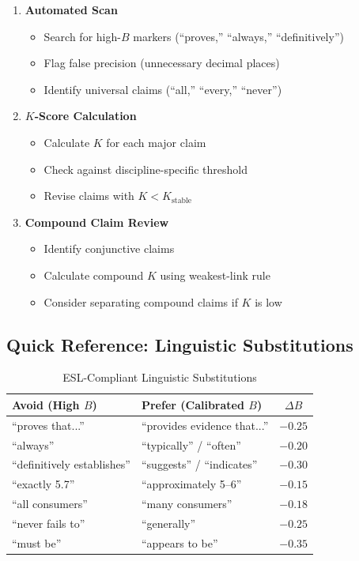 \documentclass[11pt,a4paper]{article}
\begin{document}
\begin{enumerate}
    \item \textbf{Automated Scan}
    \begin{itemize}
        \item[$\square$] Search for high-$B$ markers (``proves,'' ``always,'' ``definitively'')
        \item[$\square$] Flag false precision (unnecessary decimal places)
        \item[$\square$] Identify universal claims (``all,'' ``every,'' ``never'')
    \end{itemize}

    \item \textbf{$K$-Score Calculation}
    \begin{itemize}
        \item[$\square$] Calculate $K$ for each major claim
        \item[$\square$] Check against discipline-specific threshold
        \item[$\square$] Revise claims with $K < K_{\text{stable}}$
    \end{itemize}

    \item \textbf{Compound Claim Review}
    \begin{itemize}
        \item[$\square$] Identify conjunctive claims
        \item[$\square$] Calculate compound $K$ using weakest-link rule
        \item[$\square$] Consider separating compound claims if $K$ is low
    \end{itemize}
\end{enumerate}

\subsection{Quick Reference: Linguistic Substitutions}

\begin{table}[h]
\centering
\caption{ESL-Compliant Linguistic Substitutions}
\begin{tabular}{p{5cm}p{5cm}c}
\toprule
\textbf{Avoid (High $B$)} & \textbf{Prefer (Calibrated $B$)} & $\Delta B$ \\
\midrule
``proves that...'' & ``provides evidence that...'' & $-0.25$ \\
``always'' & ``typically'' / ``often'' & $-0.20$ \\
``definitively establishes'' & ``suggests'' / ``indicates'' & $-0.30$ \\
``exactly 5.7'' & ``approximately 5--6'' & $-0.15$ \\
``all consumers'' & ``many consumers'' & $-0.18$ \\
``never fails to'' & ``generally'' & $-0.25$ \\
``must be'' & ``appears to be'' & $-0.35$ \\
\bottomrule
\end{tabular}
\end{table}
\end{document}

